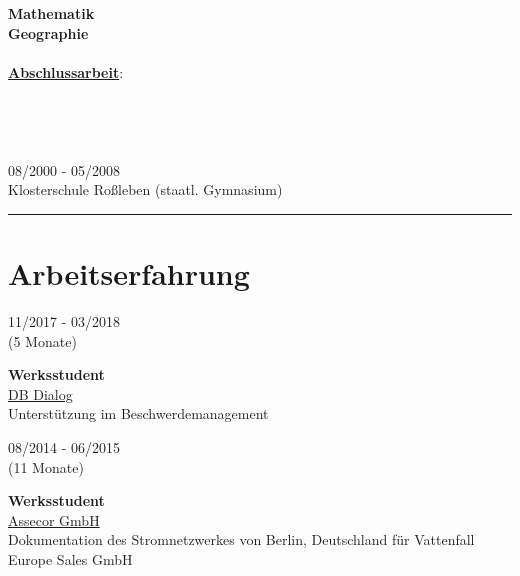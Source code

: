 \documentclass{article}
\begin{document}
\begin{minipage}[t]{0.67\textwidth}
\begin{minipage}{0.27\textwidth}
	\textbf{Mathematik}\\
	\textbf{Geographie}\\\\
	\textbf{\underline{Abschlussarbeit}}:\\
	 \\\\\\\\
	 08/2000 - 05/2008\\
Klosterschule Roßleben (staatl. Gymnasium)\\
		\end{minipage}
		\hrule
		\section*{\fontsize{18pt}{24pt}\selectfont \color{pblue} Arbeitserfahrung}
		\begin{minipage}{0.49\textwidth}
		\begin{minipage}[t]{0.25\textwidth}
		11/2017 - 03/2018\\ (5 Monate)
		\end{minipage}
		\hfill
		\begin{minipage}[t]{0.75\textwidth}
		\textbf{Werksstudent}\\ \href{https://assecor.de/}{\color{pblue}DB Dialog}\\
	    Unterstützung im Beschwerdemanagement
		\end{minipage}
		
		\vspace{0.5cm}
		
		\begin{minipage}[t]{0.25\textwidth}
		08/2014 - 06/2015\\ (11 Monate)
		\end{minipage}
		\hfill
		\begin{minipage}[t]{0.75\textwidth}
		\textbf{Werksstudent}\\
		\href{https://assecor.de/}{\color{pblue}Assecor GmbH}\\
	    Dokumentation des Stromnetzwerkes von Berlin, Deutschland für Vattenfall Europe Sales GmbH
		\end{minipage}
		
		\vspace{0.5cm}
		

\end{minipage}
\end{minipage}
\end{document}
